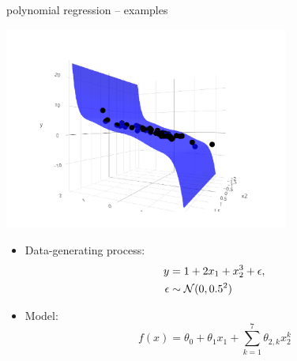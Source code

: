 \documentclass[11pt,compress,t,notes=noshow, xcolor=table]{beamer}
\begin{document}
\begin{frame}{polynomial regression -- examples}
\begin{minipage}[b]{0.5\textwidth}
  \includegraphics[width=0.7\textwidth, trim=80 0 60 80, clip]{
  figure/reg_poly_biv}
\end{minipage}
\begin{minipage}[b]{0.45\textwidth}
  \begin{itemize}
    \footnotesize
    \item
    Data-generating process: 
    \begin{align*}
      y &= 1 + 2 x_1 + x_2^3 + \epsilon, \\
      \epsilon &\sim \mathcal{N}(0, 0.5^2)
    \end{align*}
    \item Model: $$f(x) = \theta_0 + \theta_1 x_1 + 
    \sum_{k = 1}^7 \theta_{2, k} x_2^k$$
  \end{itemize}
\end{minipage}

\end{frame}

\end{document}
